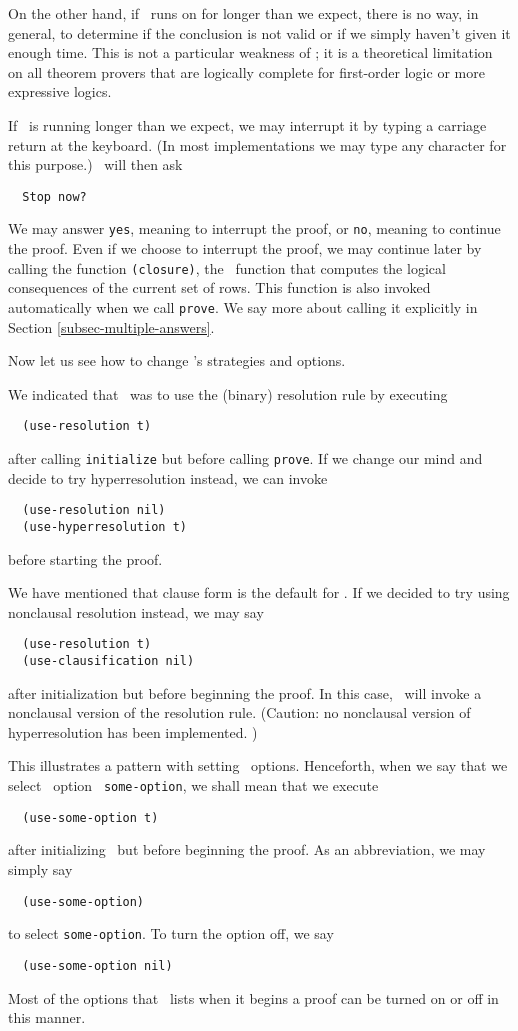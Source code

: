On the other hand, if \snark\  runs on for longer than we expect, there
is no way, in general, to determine if the conclusion is not valid or
if we simply haven't given it enough time.  This is not a particular
weakness of \snark\/; it is a theoretical limitation on all theorem
provers that are logically complete for first-order logic or more
expressive logics.

If \snark\  is running longer than we expect, we may interrupt it by
typing a carriage return at the keyboard.  (In most implementations we
may type any character for this purpose.)  \Snark\  will then ask
\begin{verbatim}
  Stop now?
\end{verbatim}
We may answer {\tt yes}, meaning to interrupt the proof, or {\tt no},
meaning to continue the proof.  Even if we choose to interrupt the
proof, we may continue later by calling the function \verb|(closure)|,
the \snark\  function that computes the logical consequences of the
current set of rows.  This function is also invoked automatically when
we call {\tt prove}.  We say more about calling it explicitly in
Section \ref{subsec-multiple-answers}.


Now let us see how to change \snark\/'s strategies and options.
\label{subsec-select-option}

We indicated that \snark\  was to use the (binary) resolution rule by
executing
\begin{verbatim}
  (use-resolution t)
\end{verbatim}
after calling \verb|initialize| but before calling
\verb|prove|.  If we change our mind and decide to try hyperresolution
instead, we can invoke
\begin{verbatim}
  (use-resolution nil)
  (use-hyperresolution t)
\end{verbatim}
before starting the proof.

\label{clausification}
We have mentioned that clause form is the default for \snark\/.  If we
decided to try using nonclausal resolution instead, we may say
\begin{verbatim}
  (use-resolution t)
  (use-clausification nil)
\end{verbatim}
after initialization but before beginning the proof.  In this case,
\snark\  will invoke a nonclausal version of the resolution rule.
(Caution: no nonclausal version of hyperresolution has been
implemented. )

This illustrates a pattern with setting \snark\  options.
Henceforth, when we say that we select \snark\  option {\tt
some-option}, we shall mean that we execute
\begin{verbatim}
  (use-some-option t)
\end{verbatim}
after initializing \snark\  but before beginning the proof.   As an
abbreviation, we may simply say
\begin{verbatim}
  (use-some-option)
\end{verbatim}
to select {\tt some-option}.  To turn the option off, we say
\begin{verbatim}
  (use-some-option nil)
\end{verbatim}
Most of the options that \snark\  lists when it begins a proof can be
turned on or off in this manner.

